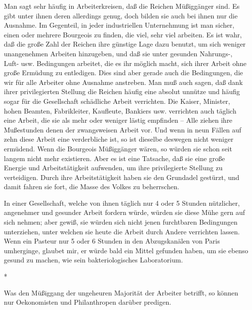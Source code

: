 \documentclass{scrbook}
\begin{document}
Man sagt sehr häufig in Arbeiterkreisen, daß die Reichen Müßiggänger sind. Es gibt unter ihnen deren allerdings genug, doch bilden sie auch bei ihnen nur die Ausnahme. Im Gegenteil, in jeder industriellen Unternehmung ist man sicher, einen oder mehrere Bourgeois zu finden, die viel, sehr viel arbeiten. Es ist wahr, daß die große Zahl der Reichen ihre günstige Lage dazu benutzt, um sich weniger unangenehmen Arbeiten hinzugeben, und daß sie unter gesunden Nahrungs-, Luft- usw. Bedingungen arbeitet, die es ihr möglich macht, sich ihrer Arbeit ohne große Ermüdung zu entledigen. Dies sind aber gerade auch die Bedingungen, die wir für alle Arbeiter ohne Ausnahme anstreben. Man muß auch sagen, daß dank ihrer privilegierten Stellung die Reichen häufig eine absolut unnütze und häufig sogar für die Gesellschaft schädliche Arbeit verrichten. Die Kaiser, Minister, hohen Beamten, Fabrikleiter, Kaufleute, Bankiers usw. verrichten auch täglich eine Arbeit, die sie als mehr oder weniger lästig empfinden – Alle ziehen ihre Mußestunden denen der zwangsweisen Arbeit vor. Und wenn in neun Fällen auf zehn diese Arbeit eine verderbliche ist, so ist dieselbe deswegen nicht weniger ermüdend. Wenn die Bourgeois Müßiggänger wären, so würden sie schon seit langem nicht mehr existieren. Aber es ist eine Tatsache, daß sie eine große Energie und Arbeitstätigkeit aufwenden, um ihre privilegierte Stellung zu verteidigen. Durch ihre Arbeitstätigkeit haben sie den Grundadel gestürzt, und damit fahren sie fort, die Masse des Volkes zu beherrschen.

In einer Gesellschaft, welche von ihnen täglich nur 4 oder 5 Stunden nützlicher, angenehmer und gesunder Arbeit fordern würde, würden sie diese Mühe gern auf sich nehmen; aber gewiß, sie würden sich nicht jenen furchtbaren Bedingungen unterziehen, unter welchen sie heute die Arbeit durch Andere verrichten lassen. Wenn ein Pasteur nur 5 oder 6 Stunden in den Abzugskanälen von Paris umherginge, glaubet mir, er würde bald ein Mittel gefunden haben, um sie ebenso gesund zu machen, wie sein bakteriologisches Laboratorium.

\begin{center}*\end{center}

Was den Müßiggang der ungeheuren Majorität der Arbeiter betrifft, so können nur Oekonomisten und Philanthropen darüber predigen.
\end{document}
